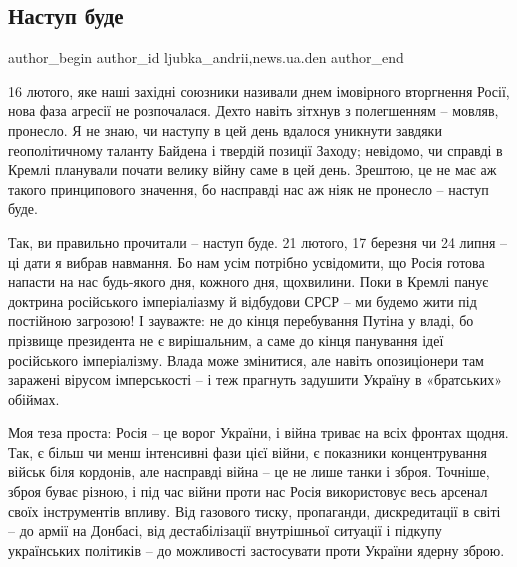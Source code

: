  
 
 
 
 
 
\subsection{Наступ буде}
\label{sec:18_02_2022.stz.news.ua.den.1.nastup_bude}
 
\ifcmt
 author_begin
   author_id ljubka_andrii,news.ua.den
 author_end
\fi

16 лютого, яке наші західні союзники називали днем імовірного вторгнення Росії,
нова фаза агресії не розпочалася. Дехто навіть зітхнув з полегшенням – мовляв,
пронесло. Я не знаю, чи наступу в цей день вдалося уникнути завдяки
геополітичному таланту Байдена і твердій позиції Заходу; невідомо, чи справді в
Кремлі планували почати велику війну саме в цей день. Зрештою, це не має аж
такого принципового значення, бо насправді нас аж ніяк не пронесло – наступ
буде.

Так, ви правильно прочитали – наступ буде. 21 лютого, 17 березня чи 24 липня –
ці дати я вибрав навмання. Бо нам усім потрібно усвідомити, що Росія готова
напасти на нас будь-якого дня, кожного дня, щохвилини. Поки в Кремлі панує
доктрина російського імперіаліазму й відбудови СРСР – ми будемо жити під
постійною загрозою! І зауважте: не до кінця перебування Путіна у владі, бо
прізвище президента не є вирішальним, а саме до кінця панування ідеї
російського імперіалізму. Влада може змінитися, але навіть опозиціонери там
заражені вірусом імперськості – і теж прагнуть задушити Україну в «братських»
обіймах.

Моя теза проста: Росія – це ворог України, і війна триває на всіх фронтах
щодня. Так, є більш чи менш інтенсивні фази цієї війни, є показники
концентрування військ біля кордонів, але насправді війна – це не лише танки і
зброя. Точніше, зброя буває різною, і під час війни проти нас Росія
використовує весь арсенал своїх інструментів впливу. Від газового тиску,
пропаганди, дискредитації в світі – до армії на Донбасі, від дестабілізації
внутрішньої ситуації і підкупу українських політиків – до можливості
застосувати проти України ядерну зброю.

